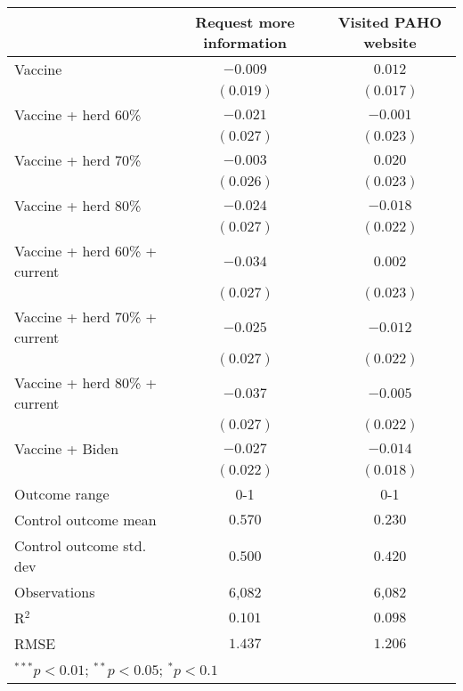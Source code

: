 \begin{table}
\begin{center}
\begin{tabular}{l c c}
\hline
 & Request more information & Visited PAHO website \\
\hline
Vaccine                       & $-0.009$  & $0.012$   \\
                              & $(0.019)$ & $(0.017)$ \\
Vaccine + herd 60\%           & $-0.021$  & $-0.001$  \\
                              & $(0.027)$ & $(0.023)$ \\
Vaccine + herd 70\%           & $-0.003$  & $0.020$   \\
                              & $(0.026)$ & $(0.023)$ \\
Vaccine + herd 80\%           & $-0.024$  & $-0.018$  \\
                              & $(0.027)$ & $(0.022)$ \\
Vaccine + herd 60\% + current & $-0.034$  & $0.002$   \\
                              & $(0.027)$ & $(0.023)$ \\
Vaccine + herd 70\% + current & $-0.025$  & $-0.012$  \\
                              & $(0.027)$ & $(0.022)$ \\
Vaccine + herd 80\% + current & $-0.037$  & $-0.005$  \\
                              & $(0.027)$ & $(0.022)$ \\
Vaccine + Biden               & $-0.027$  & $-0.014$  \\
                              & $(0.022)$ & $(0.018)$ \\
\hline
Outcome range                 & 0-1       & 0-1       \\
Control outcome mean          & $0.570$   & $0.230$   \\
Control outcome std. dev      & $0.500$   & $0.420$   \\
Observations                  & 6,082     & 6,082     \\
R$^{2}$                       & $0.101$   & $0.098$   \\
RMSE                          & $1.437$   & $1.206$   \\
\hline
\multicolumn{3}{l}{\scriptsize{$^{***}p<0.01$; $^{**}p<0.05$; $^{*}p<0.1$}}
\end{tabular}
\caption{}
\label{table:Tables and Figures/SI_table27_allinfo_pooled_behav}
\end{center}
\end{table}
